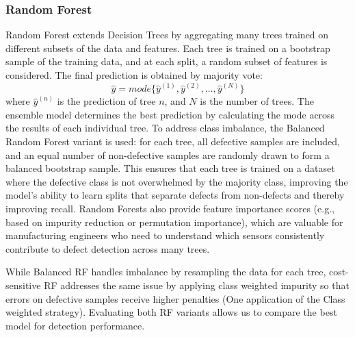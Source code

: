 \documentclass{article}
\begin{document}
\subsubsection*{Random Forest}
Random Forest extends Decision Trees by aggregating many trees trained on different subsets of the data and features. Each tree is trained on a bootstrap sample of the training data, and at each split, a random subset of features is considered. The final prediction is obtained by majority vote:
$$\hat{y} = mode\{\hat{y}^{(1)}, \hat{y}^{(2)}, \dots, \hat{y}^{(N)}\}$$
where $\hat{y}^{(n)}$ is the prediction of tree $n$, and $N$ is the number of trees. The ensemble model determines the best prediction by calculating the mode across the results of each individual tree. To address class imbalance, the Balanced Random Forest variant is used: for each tree, all defective samples are included, and an equal number of non-defective samples are randomly drawn to form a balanced bootstrap sample. This ensures that each tree is trained on a dataset where the defective class is not overwhelmed by the majority class, improving the model's ability to learn splits that separate defects from non-defects and thereby improving recall. Random Forests also provide feature importance scores (e.g., based on impurity reduction or permutation importance), which are valuable for manufacturing engineers who need to understand which sensors consistently contribute to defect detection across many trees.
 
While Balanced RF handles imbalance by resampling the data for each tree, cost-sensitive RF addresses the same issue by applying class weighted impurity so that errors on defective samples receive higher penalties (One application of the Class weighted strategy). Evaluating both RF variants allows us to compare the best model for detection performance.
 
\end{document}
